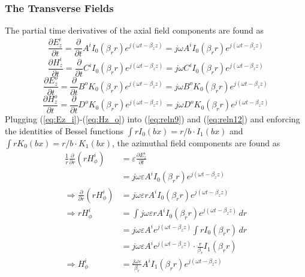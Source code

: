 \subsubsection{The Transverse Fields}\label{subsubsec:transverse}
The partial time derivatives of the axial field components are found as
\begin{equation}
	\frac{\partial E_z^i}{\partial t} = \frac{\partial}{\partial t} A^i I_0(\beta_r r) e^{j(\omega t - \beta_z z)} = j\omega A^i I_0(\beta_r r) e^{j(\omega t - \beta_z z)}
	\label{eq:Ez_i}
\end{equation}
\begin{equation}
	\frac{\partial H_z^i}{\partial t} = \frac{\partial}{\partial t} C^i I_0(\beta_r r) e^{j(\omega t - \beta_z z)} = j\omega C^i I_0(\beta_r r) e^{j(\omega t - \beta_z z)}
	\label{eq:Hz_i}
\end{equation}
\begin{equation}
	\frac{\partial E_z^o}{\partial t} = \frac{\partial}{\partial t} B^o K_0(\beta_r r) e^{j(\omega t - \beta_z z)} = j\omega B^o K_0(\beta_r r) e^{j(\omega t - \beta_z z)}
	\label{eq:Ez_o}
\end{equation}
\begin{equation}
	\frac{\partial H_z^o}{\partial t} = \frac{\partial}{\partial t} D^o K_0(\beta_r r) e^{j(\omega t - \beta_z z)} = j\omega D^o K_0(\beta_r r) e^{j(\omega t - \beta_z z)}
	\label{eq:Hz_o}
\end{equation}
Plugging (\ref{eq:Ez_i})-(\ref{eq:Hz_o}) into (\ref{eq:reln9}) and (\ref{eq:reln12}) and enforcing the identities of Bessel functions $\int rI_{0}(bx)=r/b\cdot I_{1}(bx)$ and $\int rK_{0}(bx)=r/b\cdot K_{1}(bx)$, the azimuthal field components are found as
\begin{equation}
	\begin{split}
		\frac{1}{r} \frac{\partial}{\partial r}(r H_\phi^i) &= \varepsilon \frac{\partial E_z^i}{\partial t} \\
		&= j \omega \varepsilon A^i I_0(\beta_r r) e^{j(\omega t - \beta_z z)} \\
		\Rightarrow \frac{\partial}{\partial r}(r H_\phi^i) &= j \omega \varepsilon r A^i I_0(\beta_r r) e^{j(\omega t - \beta_z z)} \\
		\Rightarrow r H_\phi^i &= \int j \omega \varepsilon r A^i I_0(\beta_r r) e^{j(\omega t - \beta_z z)} \, dr \\
		&= j \omega \varepsilon A^i e^{j(\omega t - \beta_z z)} \int r I_0(\beta_r r) \, dr \\
		&= j \omega \varepsilon A^i e^{j(\omega t - \beta_z z)} \cdot \frac{r}{\beta_r} I_1(\beta_r r) \\
		\Rightarrow H_\phi^i &= \frac{j \omega \varepsilon}{\beta_r} A^i I_1(\beta_r r) e^{j(\omega t - \beta_z z)}
	\end{split}
	\label{eq:Hphi_i}
\end{equation}


